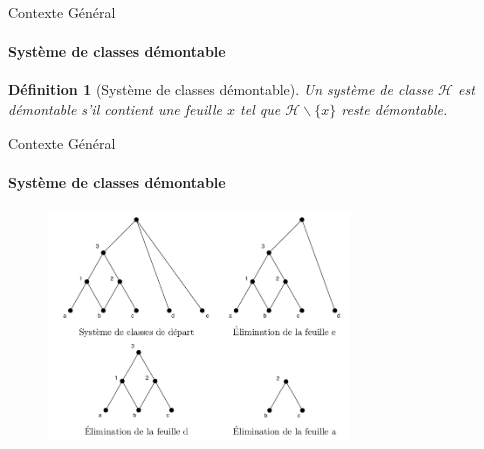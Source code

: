 \documentclass{beamer}
\newtheorem{de}{Définition}
\begin{document}
  \begin{frame}{Contexte Général}
  \framesubtitle{Système de classes démontable}
  \begin{de}[Système de classes démontable]
  Un système de classe $\mathcal{H}$ est démontable s'il contient une feuille $x$ tel que $\mathcal{H} \backslash \{x\}$ 
  reste démontable.
  \end{de}
  \end{frame}

  \begin{frame}{Contexte Général}
  \framesubtitle{Système de classes démontable}
   \begin{figure}
	\includegraphics[width=8cm]{images/e_sc.png} 
    \end{figure}
  \end{frame}
\end{document}
